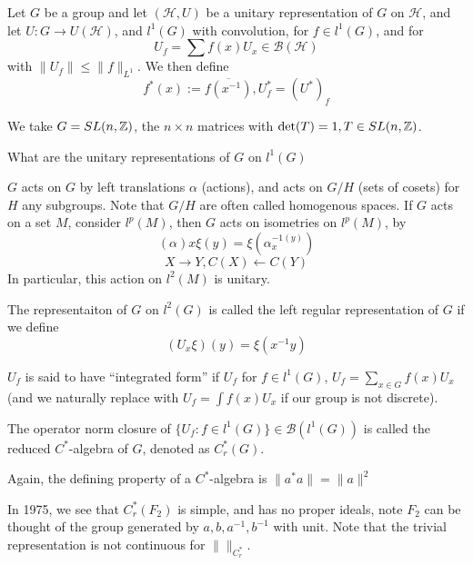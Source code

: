 Let $G$ be a group and let $(\mathcal{H}, U)$ be a unitary representation of $G$ on $\mathcal{H}$, and let $U: G\to U(\mathcal{H})$, and $l^1(G)$ with convolution, for $f\in l^1(G)$, and for 
\begin{equation*}
    U_f=\sum f(x)U_x\in\mathcal{B}(\mathcal{H})
\end{equation*}
with $\|U_f\|\leq\|f\|_{L^1}$. We then define
\begin{equation*}
    f^*(x):=\overline{f(x^{-1})}, U_f^*=(U^*)_f
\end{equation*}

We take $G=SL(n, \mathbb{Z})$, the $n\times n$ matrices with $\det(T)=1, T\in SL(n,\mathbb{Z})$. 

\begin{problem}
    What are the unitary representations of $G$ on $l^1(G)$
\end{problem}
$G$ acts on $G$ by left translations $\alpha$ (actions), and acts on $G/H$ (sets of cosets) for $H$ any subgroups. Note that $G/H$ are often called homogenous spaces. If $G$ acts on a set $M$, consider $l^p(M)$, then $G$ acts on isometries on $l^p(M)$, by
\begin{equation*}
    (\alpha)x\xi(y)=\xi(\alpha_x^{-1(y)})
\end{equation*}
\begin{equation*}
    X\rightarrow Y, C(X)\leftarrow C(Y)
\end{equation*}
In particular, this action on $l^2(M)$ is unitary.

\begin{definition}
    The representaiton of $G$ on $l^2(G)$ is called the left regular representation of $G$ if we define
    \begin{equation*}
        (U_x\xi)(y)=\xi(x^{-1}y)
    \end{equation*}
\end{definition}
$U_f$ is said to have ``integrated form'' if $U_f$ for $f\in l^1(G)$, $U_f=\sum_{x\in G} f(x)U_x$ (and we naturally replace with $U_f=\int f(x)U_x$ if our group is not discrete).

\begin{definition}
    The operator norm closure of $\{U_f: f\in l^1(G)\}\in \mathcal{B}(l^1(G))$ is called the reduced $C^*$-algebra of $G$, denoted as $C_r^*(G)$.
\end{definition}
\begin{note}
    Again, the defining property of a $C^*$-algebra is $\|a^*a\|=\|a\|^2$
\end{note}
In 1975, we see that $C_r^*(F_2)$ is simple, and has no proper ideals, note $F_2$ can be thought of the group generated by $a,b, a^{-1}, b^{-1}$ with unit. Note that the trivial representation is not continuous for $\| \|_{C_r^*}$.

